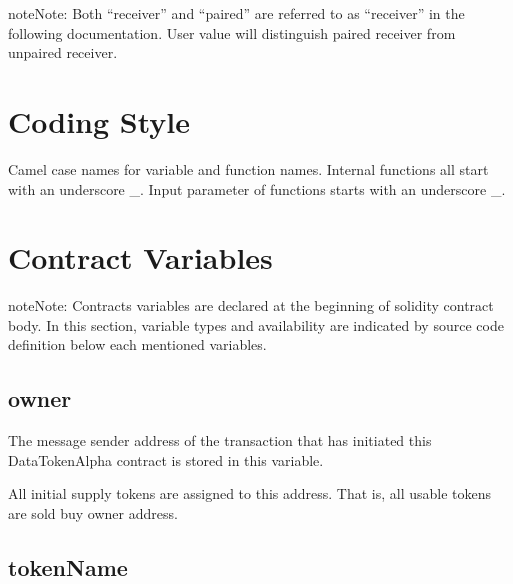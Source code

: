 \documentclass[letterpaper,10pt,english]{sphinxmanual}
\begin{document}
\begin{sphinxadmonition}{note}{Note:}
Both “receiver” and “paired” are referred to as “receiver” in the following documentation. User {\hyperref[\detokenize{index:identification}]{}} value will distinguish paired receiver from unpaired receiver.
\end{sphinxadmonition}


\chapter{Coding Style}
\label{\detokenize{index:coding-style}}
Camel case names for variable and function names.
Internal functions all start with an underscore \_.
Input parameter of functions starts with an underscore \_.


\chapter{Contract Variables}
\label{\detokenize{index:contract-variables}}
\begin{sphinxadmonition}{note}{Note:}
Contracts variables are declared at the beginning of solidity contract body.
In this section, variable types and availability are indicated by source code definition
below each mentioned variables.
\end{sphinxadmonition}


\section{owner}
\label{\detokenize{index:owner}}
%
\begin{sphinxVerbatim}[commandchars=\\\{\}]
 
\end{sphinxVerbatim}

The message sender address of the transaction that has initiated this
DataTokenAlpha contract is stored in this variable.

All initial supply tokens are assigned to this address.
That is, all usable tokens are sold buy owner address.


\section{tokenName}
\label{\detokenize{index:tokenname}}
%
\begin{sphinxVerbatim}[commandchars=\\\{\}]
    
\end{sphinxVerbatim}
\end{document}
